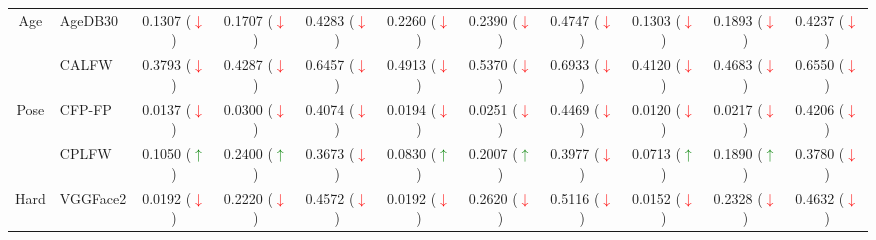 \documentclass[class=report, crop=false, a4paper, 12pt]{standalone}
\begin{document}
\begin{table}[H]
{\begin{tabular}{cl|ccc|ccc|ccc|}
    \multicolumn{1}{|c|}{\multirow{2}{*}{Age}}     & AgeDB30  & \multicolumn{1}{c|}{0.1307 (\textcolor{red}{$\downarrow$})} & \multicolumn{1}{c|}{0.1707 (\textcolor{red}{$\downarrow$})} & 0.4283 (\textcolor{red}{$\downarrow$}) & \multicolumn{1}{c|}{0.2260 (\textcolor{red}{$\downarrow$})} & \multicolumn{1}{c|}{0.2390 (\textcolor{red}{$\downarrow$})} & 0.4747 (\textcolor{red}{$\downarrow$}) & \multicolumn{1}{c|}{0.1303 (\textcolor{red}{$\downarrow$})} & \multicolumn{1}{c|}{0.1893 (\textcolor{red}{$\downarrow$})} & 0.4237 (\textcolor{red}{$\downarrow$}) \\ \cline{2-11} 
    \multicolumn{1}{|c|}{}                         & CALFW    & \multicolumn{1}{c|}{0.3793 (\textcolor{red}{$\downarrow$})} & \multicolumn{1}{c|}{0.4287 (\textcolor{red}{$\downarrow$})} & 0.6457 (\textcolor{red}{$\downarrow$}) & \multicolumn{1}{c|}{0.4913 (\textcolor{red}{$\downarrow$})} & \multicolumn{1}{c|}{0.5370 (\textcolor{red}{$\downarrow$})} & 0.6933 (\textcolor{red}{$\downarrow$}) & \multicolumn{1}{c|}{0.4120 (\textcolor{red}{$\downarrow$})} & \multicolumn{1}{c|}{0.4683 (\textcolor{red}{$\downarrow$})} & 0.6550 (\textcolor{red}{$\downarrow$}) \\ \hline
    \multicolumn{1}{|c|}{\multirow{2}{*}{Pose}}    & CFP-FP   & \multicolumn{1}{c|}{0.0137 (\textcolor{red}{$\downarrow$})} & \multicolumn{1}{c|}{0.0300 (\textcolor{red}{$\downarrow$})} & 0.4074 (\textcolor{red}{$\downarrow$}) & \multicolumn{1}{c|}{0.0194 (\textcolor{red}{$\downarrow$})} & \multicolumn{1}{c|}{0.0251 (\textcolor{red}{$\downarrow$})} & 0.4469 (\textcolor{red}{$\downarrow$}) & \multicolumn{1}{c|}{0.0120 (\textcolor{red}{$\downarrow$})} & \multicolumn{1}{c|}{0.0217 (\textcolor{red}{$\downarrow$})} & 0.4206 (\textcolor{red}{$\downarrow$}) \\ \cline{2-11} 
    \multicolumn{1}{|c|}{}                         & CPLFW    & \multicolumn{1}{c|}{0.1050 (\textcolor{green}{$\uparrow$})}   & \multicolumn{1}{c|}{0.2400 (\textcolor{green}{$\uparrow$})}   & 0.3673 (\textcolor{red}{$\downarrow$}) & \multicolumn{1}{c|}{0.0830 (\textcolor{green}{$\uparrow$})}   & \multicolumn{1}{c|}{0.2007 (\textcolor{green}{$\uparrow$})}   & 0.3977 (\textcolor{red}{$\downarrow$}) & \multicolumn{1}{c|}{0.0713 (\textcolor{green}{$\uparrow$})}   & \multicolumn{1}{c|}{0.1890 (\textcolor{green}{$\uparrow$})}   & 0.3780 (\textcolor{red}{$\downarrow$}) \\ \hline
    \multicolumn{1}{|c|}{\multirow{2}{*}{Hard}}    & VGGFace2 & \multicolumn{1}{c|}{0.0192 (\textcolor{red}{$\downarrow$})} & \multicolumn{1}{c|}{0.2220 (\textcolor{red}{$\downarrow$})} & 0.4572 (\textcolor{red}{$\downarrow$}) & \multicolumn{1}{c|}{0.0192 (\textcolor{red}{$\downarrow$})} & \multicolumn{1}{c|}{0.2620 (\textcolor{red}{$\downarrow$})} & 0.5116 (\textcolor{red}{$\downarrow$}) & \multicolumn{1}{c|}{0.0152 (\textcolor{red}{$\downarrow$})} & \multicolumn{1}{c|}{0.2328 (\textcolor{red}{$\downarrow$})} & 0.4632 (\textcolor{red}{$\downarrow$}) \\ \cline{2-11} 

\end{tabular}}
\end{table}
\end{document}
